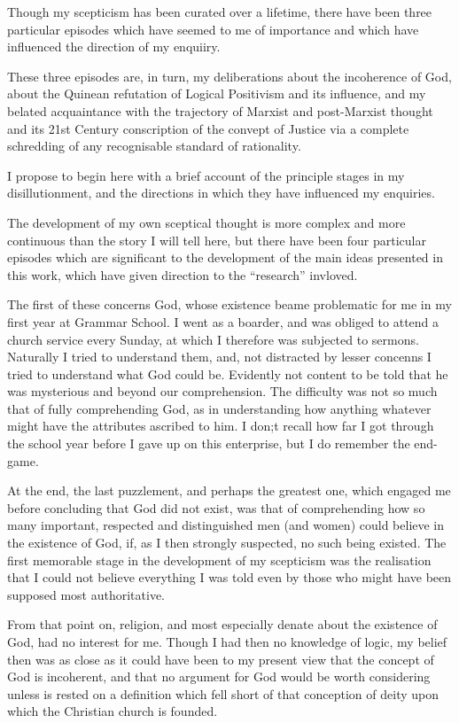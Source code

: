 \documentclass[10pt,titlepage]{book}
\begin{document}
Though my scepticism has been curated over a lifetime, there have been three particular episodes which have seemed to me of importance and which have influenced the direction of my enquiiry.

These three episodes are, in turn,  my deliberations about the incoherence of God, about the Quinean refutation of Logical Positivism and its influence, and my belated acquaintance with the trajectory of Marxist and post-Marxist thought and its 21st Century conscription of the convept of Justice via a complete schredding of any recognisable standard of rationality.


I propose to begin here with a brief account of the principle stages in my disillutionment, and the directions in which they have influenced my enquiries.

The development of my own sceptical thought is more complex and more continuous than the story I will tell here, but there have been four particular episodes which are significant to the development of the main ideas presented in this work, which have given direction to the ``research'' invloved.

The first of these concerns God, whose existence beame problematic for me in my first year at Grammar School.
I went as a boarder, and was obliged to attend a church service every Sunday, at which I therefore was subjected to sermons.
Naturally I tried to understand them, and, not distracted by lesser concenns I tried to understand what God could be.
Evidently not content to be told that he was mysterious and beyond our comprehension.
The difficulty was not so much that of fully comprehending God, as in understanding how anything whatever might have the attributes ascribed to him.
I don;t recall how far I got through the school year before I gave up on this enterprise, but I do remember the end-game.

At the end, the last puzzlement, and perhaps the greatest one, which engaged me before concluding that God did not exist, was that of comprehending how so many important, respected and distinguished men (and women) could believe in the existence of God, if, as I then strongly suspected, no such being existed.
The first memorable stage in the development of my scepticism was the realisation that I could not believe everything I was told even by those who might have been supposed most authoritative.

From that point on, religion, and most especially denate about the existence of God, had no interest for me.
Though I had then no knowledge of logic, my belief then was as close as it could have been to my present view that the concept of God is incoherent, and that no argument for God would be worth considering unless is rested on a definition which fell short of that conception of deity upon which the Christian church is founded.
\end{document}
